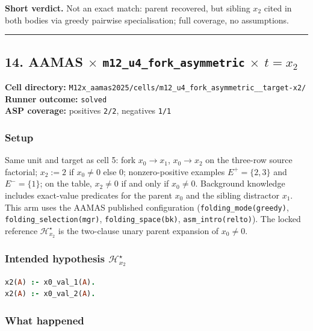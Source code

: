 \documentclass[11pt]{article}
\begin{document}
\textbf{Short verdict.} Not an exact match: parent recovered, but sibling \(x_2\) cited in both bodies via greedy pairwise specialisation; full coverage, no assumptions.

\medskip\hrule\medskip

\subsection{\texorpdfstring{14. AAMAS \(\times\) \texttt{m12\_u4\_fork\_asymmetric} \(\times\) \(t=x_2\)}{14. AAMAS - m12-u4-fork-asymmetric - target x2}}

\textbf{Cell directory:} \texttt{M12x\_aamas2025/cells/m12\_u4\_fork\_asymmetric\_\_target-x2/}\\
\textbf{Runner outcome:} \texttt{solved}\\
\textbf{ASP coverage:} positives \texttt{2/2}, negatives \texttt{1/1}

\subsubsection{Setup}

Same unit and target as cell 5: fork \(x_0\to x_1\), \(x_0\to x_2\) on the three-row source factorial; \(x_2:=2\) if \(x_0\neq 0\) else \(0\); nonzero-positive examples \(E^+=\{2,3\}\) and \(E^-=\{1\}\); on the table, \(x_2\neq 0\) if and only if \(x_0\neq 0\). Background knowledge includes exact-value predicates for the parent \(x_0\) and the sibling distractor \(x_1\). This arm uses the AAMAS published configuration (\texttt{folding\_mode(greedy)}, \texttt{folding\_selection(mgr)}, \texttt{folding\_space(bk)}, \texttt{asm\_intro(relto)}). The locked reference \(\mathcal{H}_{x_2}^\star\) is the two-clause unary parent expansion of \(x_0\neq 0\).

\subsubsection{\texorpdfstring{Intended hypothesis \(\mathcal{H}_{x_2}^\star\)}{Intended hypothesis H-star(x2)}}

\begin{lstlisting}[style=logic,language=Prolog]
x2(A) :- x0_val_1(A).
x2(A) :- x0_val_2(A).
\end{lstlisting}

\subsubsection{What happened}
\end{document}
